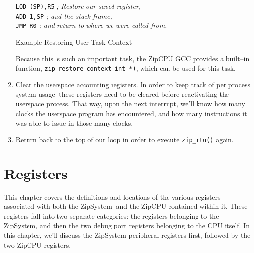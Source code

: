 \documentclass{gqtekspec}
\begin{document}
\begin{enumerate}
\begin{table}
\begin{center}
\begin{tabbing}
\>	{\tt LOD (SP),R5} \> {\em ; Restore our saved register, } \\
\>	{\tt ADD 1,SP}	\> {\em ; and the stack frame, }\\
\>	{\tt JMP R0}	\> {\em ; and return to where we were called from.}\\
\end{tabbing}
\caption{Example Restoring User Task Context}\label{tbl:context-in}
\end{center}\end{table}
	Because this is such an important task, the ZipCPU GCC provides a
	built--in function, {\tt zip\_restore\_context(int *)}, which can be
	used for this task.  

\item Clear the userspace accounting registers.  In order to keep track of
	per process system usage, these registers need to be cleared before
	reactivating the userspace process.  That way, upon the next
	interrupt, we'll know how many clocks the userspace program has
	encountered, and how many instructions it was able to issue in
	those many clocks. 

\item Return back to the top of our loop in order to execute {\tt zip\_rtu()}
	again.
\end{enumerate}


\chapter{Registers}\label{chap:regs}
This chapter covers the definitions and locations of the various registers
associated with both the ZipSystem, and the ZipCPU contained within it.
These registers fall into two separate categories: the registers belonging
to the ZipSystem, and then the two debug port registers belonging to the CPU
itself.  In this chapter, we'll discuss the ZipSystem peripheral registers
first, followed by the two ZipCPU registers.
\end{document}
